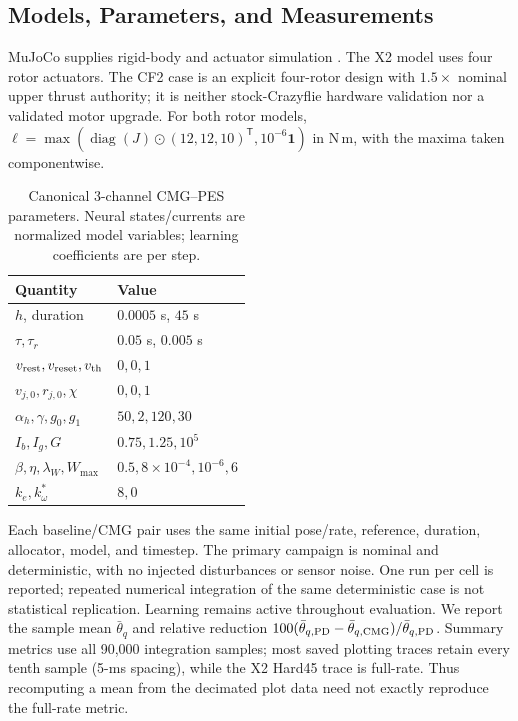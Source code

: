 \documentclass[letterpaper, 10 pt, conference]{ieeeconf}
\newcommand{\T}{^{\mathsf T}}
\begin{document}
\subsection{Models, Parameters, and Measurements}
MuJoCo supplies rigid-body and actuator simulation \cite{todorov2012mujoco}.
The X2 model uses four rotor actuators. The CF2 case is an explicit
four-rotor design with $1.5\times$ nominal upper thrust authority; it is
neither stock-Crazyflie hardware validation nor a validated motor upgrade.
For both rotor models,
$\bm\ell=\max(\operatorname{diag}(J)\odot(12,12,10)\T,10^{-6}\bm1)$
in N\,m, with the maxima taken componentwise.



\begin{table}[t]
\caption{Canonical 3-channel CMG--PES parameters. Neural states/currents
are normalized model variables; learning coefficients are per step.}
\label{tab:parameters}\centering\small
\begin{tabular}{ll}
\toprule
Quantity & Value\\\midrule
$h$, duration & $0.0005$ s, $45$ s\\
$\tau,\tau_r$ & $0.05$ s, $0.005$ s\\
$v_{\rm rest},v_{\rm reset},v_{\rm th}$ & $0,0,1$\\
$v_{j,0},r_{j,0},\chi$ & $0,0,1$\\
$\alpha_h,\gamma,g_0,g_1$ & $50,2,120,30$\\
$I_b,I_g,G$ & $0.75,1.25,10^5$\\
$\beta,\eta,\lambda_W,W_{\max}$ & $0.5,8\times10^{-4},10^{-6},6$\\
$k_e,k_\omega^*$ & $8,0$\\
\bottomrule
\end{tabular}
\end{table}

Each baseline/CMG pair uses the same initial pose/rate, reference, duration,
allocator, model, and timestep. The primary campaign is nominal and
deterministic, with no injected disturbances or sensor noise. One run per
cell is reported; repeated numerical integration of the same deterministic
case is not statistical replication. Learning remains active throughout
evaluation. We report the sample mean $\bar\theta_q$ and relative reduction
$100(\bar\theta_{q,\rm PD}-\bar\theta_{q,\rm CMG})/\bar\theta_{q,\rm PD}$.
Summary metrics use all 90,000 integration samples; most saved plotting
traces retain every tenth sample (5-ms spacing), while the X2 Hard45
trace is full-rate. Thus recomputing a mean from
the decimated plot data need not exactly reproduce the full-rate metric.
\end{document}
